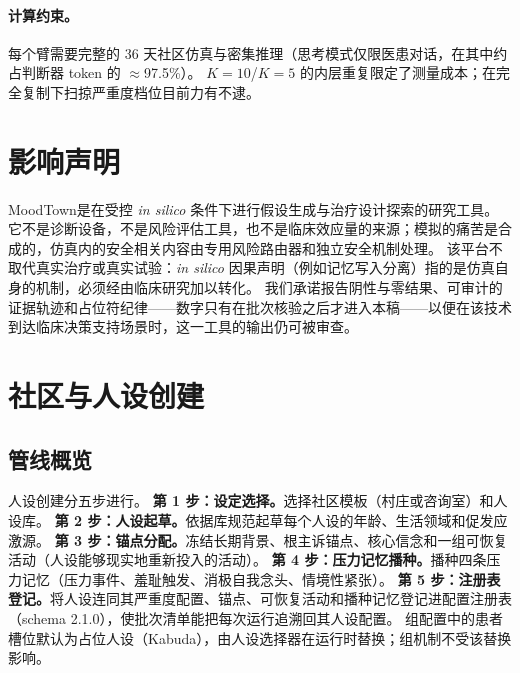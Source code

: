 \documentclass[11pt,a4paper]{article}
\newcommand{\sys}{MoodTown}
\begin{document}
\paragraph{计算约束。}
每个臂需要完整的 36 天社区仿真与密集推理（思考模式仅限医患对话，在其中约占判断器 token 的 $\approx$97.5\%）。
$K=10$/$K=5$ 的内层重复限定了测量成本；在完全复制下扫掠严重度档位目前力有不逮。

\section*{影响声明}

\sys 是在受控 \emph{in silico} 条件下进行假设生成与治疗设计探索的研究工具。
它不是诊断设备，不是风险评估工具，也不是临床效应量的来源；模拟的痛苦是合成的，仿真内的安全相关内容由专用风险路由器和独立安全机制处理。
该平台不取代真实治疗或真实试验：\emph{in silico} 因果声明（例如记忆写入分离）指的是仿真自身的机制，必须经由临床研究加以转化。
我们承诺报告阴性与零结果、可审计的证据轨迹和占位符纪律——数字只有在批次核验之后才进入本稿——以便在该技术到达临床决策支持场景时，这一工具的输出仍可被审查。




\appendix

\section{社区与人设创建}\label{app:personas}

\subsection{管线概览}

人设创建分五步进行。
\textbf{第 1 步：设定选择。}选择社区模板（村庄或咨询室）和人设库。
\textbf{第 2 步：人设起草。}依据库规范起草每个人设的年龄、生活领域和促发应激源。
\textbf{第 3 步：锚点分配。}冻结长期背景、根主诉锚点、核心信念和一组可恢复活动（人设能够现实地重新投入的活动）。
\textbf{第 4 步：压力记忆播种。}播种四条压力记忆（压力事件、羞耻触发、消极自我念头、情境性紧张）。
\textbf{第 5 步：注册表登记。}将人设连同其严重度配置、锚点、可恢复活动和播种记忆登记进配置注册表（schema 2.1.0），使批次清单能把每次运行追溯回其人设配置。
组配置中的患者槽位默认为占位人设（Kabuda），由人设选择器在运行时替换；组机制不受该替换影响。
\end{document}
